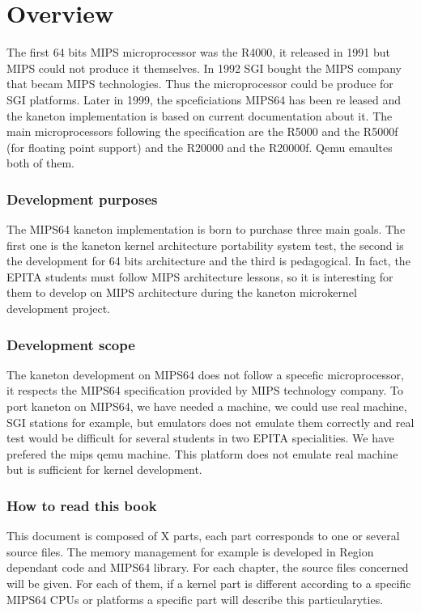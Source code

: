%
%
%
%
%
%

%
%

\chapter{Overview}

The first 64 bits MIPS microprocessor was the R4000, it released in 1991 but MIPS could not produce it themselves. In 1992 SGI bought the MIPS company that becam MIPS technologies. Thus the microprocessor could be produce for SGI platforms. Later in 1999, the spceficiations MIPS64 has been re
leased and the kaneton implementation is based on current documentation about it. The main microprocessors following the specification are the R5000 and the R5000f (for floating point support) and the R20000 and the R20000f. Qemu emaultes both of them.

\subsection{Development purposes}

The MIPS64 kaneton implementation is born to purchase three main goals.
The first one is the kaneton kernel architecture portability system test,
the second is the development for 64 bits architecture and the third is pedagogical.
In fact, the EPITA students must follow MIPS architecture lessons, so it is interesting 
for them to develop on MIPS architecture during the kaneton microkernel development
project.

\subsection{Development scope}

The kaneton development on MIPS64 does not follow a specefic microprocessor, it respects the MIPS64 specification provided by MIPS technology company.
To port kaneton on MIPS64, we have needed a machine, we could use real machine, SGI stations for example, but emulators does not emulate them correctly and real test would be difficult for several students in two EPITA specialities. We have prefered the mips qemu machine. This platform does not emulate real machine but is sufficient for kernel development.

\subsection{How to read this book}

This document is composed of X parts, each part corresponds to one or several source files. The memory management for example is developed in Region dependant code and MIPS64 library. For each chapter, the source files concerned will be given.
For each of them, if a kernel part is different according to a specific MIPS64 CPUs or platforms a specific part will describe this particularyties.

